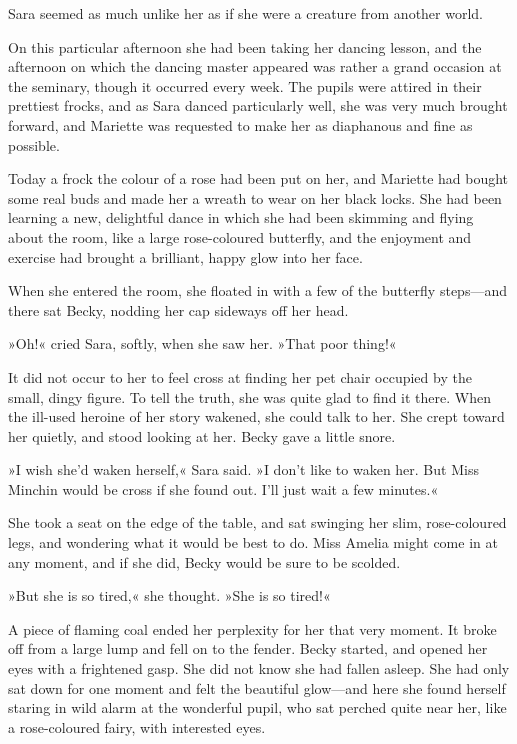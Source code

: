 Sara seemed as much unlike her as if she were a creature from another world.

On this particular afternoon she had been taking her dancing lesson, and the afternoon on which the dancing master appeared was rather a grand occasion at the seminary, though it occurred every week. The pupils were attired in their prettiest frocks, and as Sara danced particularly well, she was very much brought forward, and Mariette was requested to make her as diaphanous and fine as possible.

Today a frock the colour of a rose had been put on her, and Mariette had bought some real buds and made her a wreath to wear on her black locks. She had been learning a new, delightful dance in which she had been skimming and flying about the room, like a large rose-coloured butterfly, and the enjoyment and exercise had brought a brilliant, happy glow into her face.

When she entered the room, she floated in with a few of the butterfly steps—and there sat Becky, nodding her cap sideways off her head.

»Oh!« cried Sara, softly, when she saw her. »That poor thing!«

It did not occur to her to feel cross at finding her pet chair occupied by the small, dingy figure. To tell the truth, she was quite glad to find it there. When the ill-used heroine of her story wakened, she could talk to her. She crept toward her quietly, and stood looking at her. Becky gave a little snore.

»I wish she'd waken herself,« Sara said. »I don't like to waken her. But Miss Minchin would be cross if she found out. I'll just wait a few minutes.«

She took a seat on the edge of the table, and sat swinging her slim, rose-coloured legs, and wondering what it would be best to do. Miss Amelia might come in at any moment, and if she did, Becky would be sure to be scolded.

»But she is so tired,« she thought. »She is so tired!«

A piece of flaming coal ended her perplexity for her that very moment. It broke off from a large lump and fell on to the fender. Becky started, and opened her eyes with a frightened gasp. She did not know she had fallen asleep. She had only sat down for one moment and felt the beautiful glow—and here she found herself staring in wild alarm at the wonderful pupil, who sat perched quite near her, like a rose-coloured fairy, with interested eyes.

